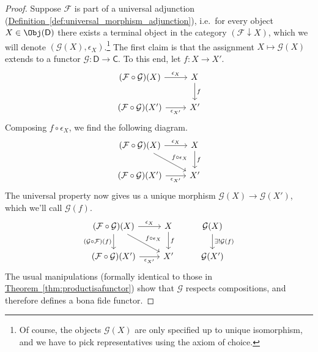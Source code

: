 \documentclass[notes.tex]{subfiles}
\begin{document}
\begin{proof}
  Suppose $\mathcal{F}$ is part of a universal adjunction (\hyperref[def:universal_morphism_adjunction]{Definition~\ref*{def:universal_morphism_adjunction}}), i.e.\ for every object $X \in \Obj(\mathsf{D})$ there exists a terminal object in the category $(\mathcal{F} \downarrow X)$, which we will denote $(\mathcal{G}(X), \epsilon_{X})$.\footnote{Of course, the objects $\mathcal{G}(X)$ are only specified up to unique isomorphism, and we have to pick representatives using the axiom of choice.} The first claim is that the assignment $X \mapsto \mathcal{G}(X)$ extends to a functor $\mathcal{G}\colon \mathsf{D} \to \mathsf{C}$.  To this end, let $f\colon X \to X'$.
  \begin{equation*}
    \begin{tikzcd}
      (\mathcal{F} \circ \mathcal{G})(X)
      \arrow[r, "\epsilon_{X}"]
      & X
      \arrow[d, "f"]
      \\
      (\mathcal{F} \circ \mathcal{G})(X')
      \arrow[r, swap, "\epsilon_{X'}"]
      & X'
    \end{tikzcd}
  \end{equation*}
  Composing $f \circ \epsilon_{X}$, we find the following diagram.
  \begin{equation*}
    \begin{tikzcd}
      (\mathcal{F} \circ \mathcal{G})(X)
      \arrow[r, "\epsilon_{X}"]
      \arrow[rd, "f \circ \epsilon_{X}"]
      & X
      \arrow[d, "f"]
      \\
      (\mathcal{F} \circ \mathcal{G})(X')
      \arrow[r, swap, "\epsilon_{X'}"]
      & X'
    \end{tikzcd}
  \end{equation*}
  The universal property now gives us a unique morphism $\mathcal{G}(X) \to \mathcal{G}(X')$, which we'll call $\mathcal{G}(f)$.
  \begin{equation*}
    \begin{tikzcd}
      (\mathcal{F} \circ \mathcal{G})(X)
      \arrow[r, "\epsilon_{X}"]
      \arrow[rd, "f \circ \epsilon_{X}"]
      \arrow[d, swap, "(\mathcal{G} \circ \mathcal{F})(f)"]
      & X
      \arrow[d, "f"]
      & \mathcal{G}(X)
      \arrow[d, "\exists!\mathcal{G}(f)"]
      \\
      (\mathcal{F} \circ \mathcal{G})(X')
      \arrow[r, swap, "\epsilon_{X'}"]
      & X'
      & \mathcal{G}(X')
    \end{tikzcd}
  \end{equation*}
  The usual manipulations (formally identical to those in \hyperref[thm:productisafunctor]{Theorem~\ref*{thm:productisafunctor}}) show that $\mathcal{G}$ respects compositions, and therefore defines a bona fide functor.


\end{proof}
\end{document}
